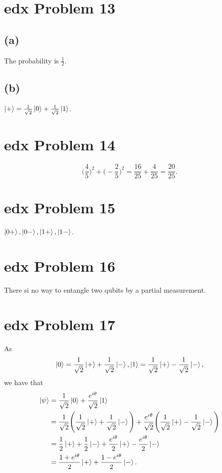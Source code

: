 \documentclass[10pt]{article}
\begin{document}
\section*{edx Problem 13}
\subsection*{(a)} 
The probability is $\frac{1}{2}$.

\subsection*{(b)}
$\ket{+} = \frac{1}{\sqrt{2}} \ket{0} + \frac{1}{\sqrt{2}} \ket{1}$.

\section*{edx Problem 14}
\[
\Bigg( \frac{4}{5} \Bigg)^2 + \Bigg( -\frac{2}{5} \Bigg)^2 = \frac{16}{25} + \frac{4}{25} = \frac{20}{25}.
\]

\section*{edx Problem 15}
$\ket{0+}, \ket{0-}, \ket{1+}, \ket{1-}$.

\section*{edx Problem 16}
There si no way to entangle two qubits by a partial measurement.

\section*{edx Problem 17}
As 
\[
\ket{0} = \frac{1}{\sqrt{2}} \ket{+} + \frac{1}{\sqrt{2}} \ket{-}, \ket{1} = \frac{1}{\sqrt{2}} \ket{+} - \frac{1}{\sqrt{2}} \ket{-},
\]
we have that
\begin{align*}
\ket{\psi} &= \frac{1}{\sqrt{2}} \ket{0} + \frac{e^{i\theta}}{\sqrt{2}} \ket{1} \\
                &= \frac{1}{\sqrt{2}} \Bigg( \frac{1}{\sqrt{2}} \ket{+} + \frac{1}{\sqrt{2}} \ket{-} \Bigg) + \frac{e^{i\theta}}{\sqrt{2}} \Bigg( \frac{1}{\sqrt{2}} \ket{+} - \frac{1}{\sqrt{2}} \ket{-} \Bigg) \\
                &= \frac{1}{2} \ket{+} + \frac{1}{2} \ket{-} + \frac{e^{i \theta}}{2} \ket{+} - \frac{e^{i \theta}}{2} \ket{-} \\
                &= \frac{1 + e^{i \theta}}{2} \ket{+} + \frac{1 - e^{i \theta}}{2} \ket{-}.
\end{align*}
\end{document}
